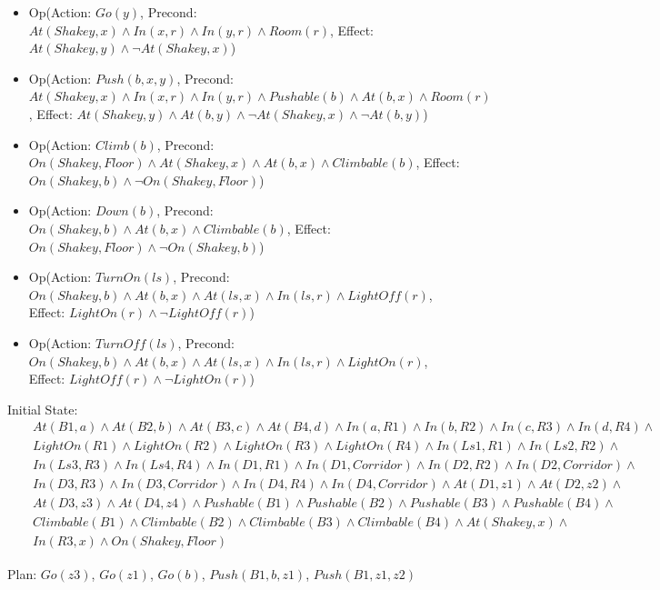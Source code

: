 \documentclass[10pt]{article}
\begin{document}
\begin{enumerate}
\begin{itemize}
  \item Op(Action: $Go(y)$, 
           Precond: $At(Shakey,x) \land In(x,r) \land In(y,r) \land Room(r)$, 
           Effect: $At(Shakey,y) \land \neg At(Shakey,x)$)
  \item Op(Action: $Push(b,x,y)$,
           Precond: $At(Shakey,x) \land In(x,r) \land In(y,r) \land 
                     Pushable(b) \land At(b,x) \land Room(r)$, 
           Effect: $At(Shakey,y) \land At(b,y) \land 
                    \neg At(Shakey,x) \land \neg At(b,y)$)
  \item Op(Action: $Climb(b)$,
           Precond: $On(Shakey,Floor) \land At(Shakey,x) \land 
                     At(b,x) \land Climbable(b)$,
           Effect: $On(Shakey,b) \land \neg On(Shakey,Floor)$)
  \item Op(Action: $Down(b)$,
           Precond: $On(Shakey,b) \land At(b,x) \land Climbable(b)$,
           Effect: $On(Shakey,Floor) \land \neg On(Shakey,b)$)
  \item Op(Action: $TurnOn(ls)$,
           Precond: $On(Shakey,b) \land At(b,x) \land At(ls,x) \land
                     In(ls,r) \land LightOff(r)$,
           Effect: $LightOn(r) \land \neg LightOff(r)$)
  \item Op(Action: $TurnOff(ls)$,
           Precond: $On(Shakey,b) \land At(b,x) \land At(ls,x) \land
                     In(ls,r) \land LightOn(r)$,
           Effect: $LightOff(r) \land \neg LightOn(r)$)
  \end{itemize}

  Initial State: 
  \begin{eqnarray*}
  & & At(B1,a) \land At(B2,b) \land At(B3,c) \land At(B4,d) \land In(a,R1) \land
      In(b,R2) \land In(c,R3) \land In(d,R4) \land \\
  & & LightOn(R1) \land LightOn(R2) \land LightOn(R3) \land LightOn(R4) \land 
      In(Ls1,R1) \land In(Ls2,R2) \land \\
  & & In(Ls3,R3) \land In(Ls4,R4) \land In(D1,R1) \land
      In(D1,Corridor) \land In(D2,R2) \land In(D2,Corridor) \land \\
  & & In(D3,R3) \land In(D3,Corridor) \land In(D4,R4) \land 
      In(D4,Corridor) \land At(D1,z1) \land At(D2,z2) \land \\
  & & At(D3,z3) \land At(D4,z4) \land Pushable(B1) \land 
      Pushable(B2) \land Pushable(B3) \land Pushable(B4) \land \\
  & & Climbable(B1) \land Climbable(B2) \land Climbable(B3) \land 
      Climbable(B4) \land At(Shakey,x) \land \\
  & & In(R3,x) \land On(Shakey,Floor)
  \end{eqnarray*}

  Plan: $Go(z3)$, $Go(z1)$, $Go(b)$, $Push(B1,b,z1)$, $Push(B1,z1,z2)$
\end{enumerate}
\end{document}

